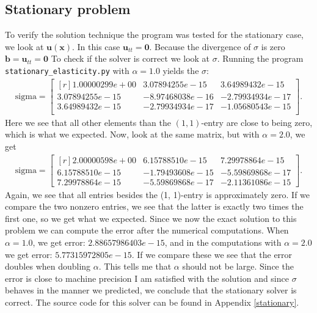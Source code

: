 \documentclass[twoside]{article}
\begin{document}
\subsection{Stationary problem}
To verify the solution technique the program was tested for the stationary case, we look at \( \mathbf{u}(\mathbf{x})\). In this case \( \mathbf{u}_{tt} = \mathbf{0}\). Because the divergence of \( \sigma \) is zero \( \mathbf{b} = \mathbf{u}_{tt} = \mathbf{0}\) To check if the solver is correct we look at \( \sigma\). Running the program \texttt{stationary\_elasticity.py} with \( \alpha = 1.0\) yields the \( \sigma\):
\begin{align*}
\text{sigma}= 
\begin{bmatrix*}[r]
 1.00000299e+00   &  3.07894255e-15  & 3.64989432e-15 \\
   3.07894255e-15  & -8.97468038e-16  & -2.79934934e-17\\
   3.64989432e-15  & -2.79934934e-17  & -1.05680543e-15\\
 \end{bmatrix*}.
\end{align*}
Here we see that all other elements than the \( (1,1)\)-entry are close to being zero, which is what we expected. 
Now, look at the same matrix, but with \( \alpha = 2.0\), we get
\begin{align*}
\text{sigma}= 
\begin{bmatrix*}[r]
  2.00000598e+00 &   6.15788510e-15 &  7.29978864e-15 \\
  6.15788510e-15  & -1.79493608e-15 & -5.59869868e-17 \\
  7.29978864e-15  & -5.59869868e-17 & -2.11361086e-15
 \end{bmatrix*}.
\end{align*}
Again, we see that all entries besides the (1, 1)-entry is approximately zero. If we compare the two nonzero entries, we see that the latter is exactly two times the first one, so we get what we expected.
Since we now the exact solution to this problem we can compute the error after the numerical computations.
When \( \alpha = 1.0\), we get error: \( 2.88657986403e-15\), and in the computations with \( \alpha = 2.0\) we get error: \( 5.77315972805e-15\). If we compare these we see that the error doubles when doubling \( \alpha\). This tells me that \( \alpha\) should not be large. Since the error is close to machine precision I am satisfied with the solution and since \( \sigma\) behaves in the manner we predicted, we conclude that the stationary solver is correct. The source code for this solver can be found in Appendix \ref{stationary}.
\end{document}
